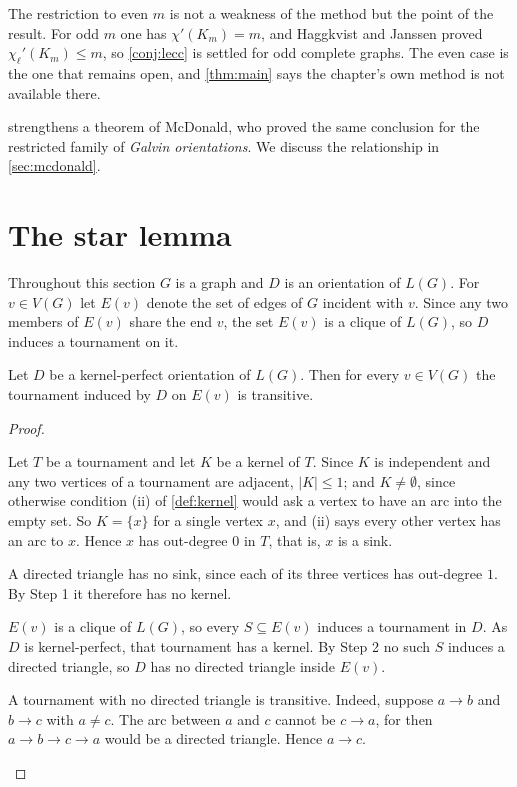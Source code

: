 \documentclass[11pt]{article}
\numberwithin{equation}{section}
\theoremstyle{plain}
\newcommand{\chpl}{\chi_{\ell}'}
\newcommand{\LG}{L}
\begin{document}
The restriction to even $m$ is not a weakness of the method but the point of the result.
For odd $m$ one has $\chi'(K_m)=m$, and Haggkvist and Janssen proved $\chpl(K_m)\le m$, so
\cref{conj:lecc} is settled for odd complete graphs. The even case is the one that remains
open, and \cref{thm:main} says the chapter's own method is not available there.

 strengthens a theorem of McDonald, who proved the same conclusion for the
restricted family of \emph{Galvin orientations}. We discuss the relationship in
\cref{sec:mcdonald}.

\section{The star lemma}\label{sec:star}

Throughout this section $G$ is a graph and $D$ is an orientation of $\LG(G)$. For
$v\in V(G)$ let $E(v)$ denote the set of edges of $G$ incident with $v$. Since any two
members of $E(v)$ share the end $v$, the set $E(v)$ is a clique of $\LG(G)$, so $D$ induces a
tournament on it.

\begin{lemma}\label{lem:star}
Let $D$ be a kernel-perfect orientation of $\LG(G)$. Then for every $v\in V(G)$ the tournament
induced by $D$ on $E(v)$ is transitive.
\end{lemma}

\begin{proof}
\begin{steps}
\item Let $T$ be a tournament and let $K$ be a kernel of $T$. Since $K$ is independent and
any two vertices of a tournament are adjacent, $|K|\le 1$; and $K\ne\emptyset$, since
otherwise condition (ii) of \cref{def:kernel} would ask a vertex to have an arc into the
empty set. So $K=\{x\}$ for a single vertex $x$, and (ii) says every other vertex has an arc
to $x$. Hence $x$ has out-degree $0$ in $T$, that is, $x$ is a sink.

\item A directed triangle has no sink, since each of its three vertices has out-degree $1$.
By Step 1 it therefore has no kernel.

\item $E(v)$ is a clique of $\LG(G)$, so every $S\subseteq E(v)$ induces a tournament in $D$.
As $D$ is kernel-perfect, that tournament has a kernel. By Step 2 no such $S$ induces a
directed triangle, so $D$ has no directed triangle inside $E(v)$.

\item A tournament with no directed triangle is transitive. Indeed, suppose $a\to b$ and
$b\to c$ with $a\ne c$. The arc between $a$ and $c$ cannot be $c\to a$, for then
$a\to b\to c\to a$ would be a directed triangle. Hence $a\to c$. \qedhere
\end{steps}
\end{proof}
\end{document}

